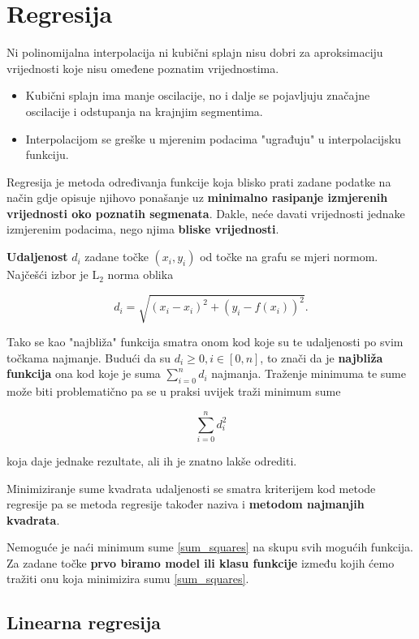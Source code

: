 
\section{Regresija}

Ni polinomijalna interpolacija ni kubični splajn nisu dobri za aproksimaciju
vrijednosti koje nisu omeđene poznatim vrijednostima.
\begin{itemize}
    \item Kubični splajn ima manje oscilacije, no i dalje se pojavljuju značajne
    oscilacije i odstupanja na krajnjim segmentima.
    \item Interpolacijom se greške u mjerenim podacima "ugrađuju" u
    interpolacijsku funkciju.
\end{itemize}

Regresija je metoda određivanja funkcije koja blisko prati zadane podatke na
način gdje opisuje njihovo ponašanje uz \textbf{minimalno rasipanje izmjerenih
vrijednosti oko poznatih segmenata}. Dakle, neće davati vrijednosti jednake
izmjerenim podacima, nego njima \textbf{bliske vrijednosti}.

\textbf{Udaljenost} $d_i$ zadane točke $(x_i, y_i)$ od točke na grafu se mjeri
normom. Najčešći izbor je $\mathrm{L}_2$ norma oblika

$$
d_i=\sqrt{(x_i-x_i)^2+(y_i-f(x_i))^2}.
$$

Tako se kao "najbliža" funkcija smatra onom kod koje su te udaljenosti po svim
točkama najmanje. Budući da su $d_i\geq0, i\in[0,n]$, to znači da je
\textbf{najbliža funkcija} ona kod koje je suma $\sum_{i=0}^nd_i$ najmanja.
Traženje minimuma te sume može biti problematično pa se u praksi uvijek traži
minimum sume

\begin{equation}
    \label{sum_squares}
    \sum_{i=0}^nd_i^2
\end{equation}

koja daje jednake rezultate, ali ih je znatno lakše odrediti.

Minimiziranje sume kvadrata udaljenosti se smatra kriterijem kod metode
regresije pa se metoda regresije također naziva i \textbf{metodom najmanjih
kvadrata}.

Nemoguće je naći minimum sume \ref{sum_squares} na skupu svih mogućih funkcija.
Za zadane točke \textbf{prvo biramo model ili klasu funkcije} između kojih ćemo
tražiti onu koja minimizira sumu \ref{sum_squares}.

\subsection{Linearna regresija}

